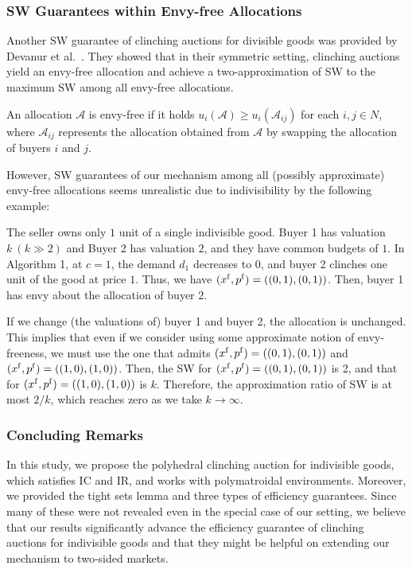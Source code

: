 \documentclass[letterpaper,11pt]{article}
\begin{document}
\subsubsection{SW Guarantees within Envy-free Allocations}
	Another SW guarantee of clinching auctions for divisible goods was provided by Devanur et al.~\cite{DHH2013}. They showed that in their symmetric setting, clinching auctions yield an envy-free allocation and achieve a two-approximation of SW to the maximum SW among all envy-free allocations. 
	\begin{definition}
	An allocation $\mathcal A$ is envy-free if it holds 
	$u_i(\mathcal A)\geq u_i(\mathcal A_{ij})$ for each $i,j\in N$, 
	where $\mathcal A_{ij}$ represents the allocation obtained from $\mathcal A$ by swapping the allocation of buyers $i$ and $j$.
	\end{definition}
	However, SW guarantees of our mechanism among all (possibly approximate) envy-free allocations 
	seems unrealistic due to indivisibility by the following example:
	
\begin{example}
	\label{envy_free}
	The seller owns only $1$ unit of a single indivisible good. 
	Buyer 1 has valuation $k\ (k\gg 2)$ and Buyer 2 has valuation $2$, 
	and they have common budgets of $1$. 
	In Algorithm 1, at $c=1$, the demand $d_1$ decreases to $0$, and 
	buyer 2 clinches one unit of the good at price $1$. 
	Thus, we have $(x^{\rm f}, p^{\rm f})=((0,1), (0,1))$.
	Then, buyer 1 has envy about the allocation of buyer 2.
	
	If we change (the valuations of) buyer 1 and buyer 2, the allocation is unchanged.
	This implies that even if we consider using some approximate notion of envy-freeness, 
	we must use the one that admits $(x^{\rm f}, p^{\rm f})=((0,1), (0,1))$ and $(x^{\rm f}, p^{\rm f})=((1,0), (1,0))$.
	Then, the SW for $(x^{\rm f}, p^{\rm f})=((0,1), (0,1))$ is 2, and that for $(x^{\rm f}, p^{\rm f})=((1,0), (1,0))$ is $k$.
	Therefore, the approximation ratio of SW is at most $2/k$, which reaches zero as we take $k\to\infty$.
\end{example}


\subsubsection{Concluding Remarks}
	In this study, we propose the polyhedral clinching auction for indivisible goods, 
	which satisfies IC and IR, and works with polymatroidal environments. 
	Moreover, we provided the tight sets lemma and three types of efficiency guarantees. 
	Since many of these were not revealed even in the special case of our setting, 
	we believe that our results significantly advance the efficiency guarantee 
	of clinching auctions for indivisible goods and that they might be helpful on extending our mechanism to two-sided markets. 
	
\end{document}
